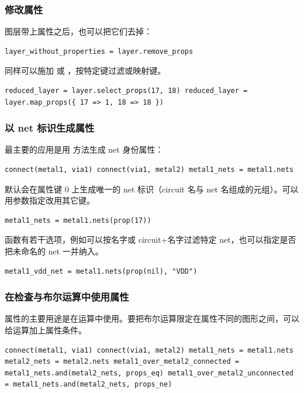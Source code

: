 \subsubsection{修改属性}

图层带上属性之后，也可以把它们去掉：

\begin{lstlisting}
layer_without_properties = layer.remove_props
\end{lstlisting}

同样可以施加  或 ，按特定键过滤或映射键。

\begin{lstlisting}
reduced_layer = layer.select_props(17, 18) reduced_layer = layer.map_props({ 17 => 1, 18 => 18 })
\end{lstlisting}

\subsubsection{以 net 标识生成属性}

最主要的应用是用  方法生成 net 身份属性：

\begin{lstlisting}
connect(metal1, via1) connect(via1, metal2) metal1_nets = metal1.nets
\end{lstlisting}

默认会在属性键 0 上生成唯一的 net 标识（circuit 名与 net 名组成的元组）。可以用参数指定改用其它键。

\begin{lstlisting}
metal1_nets = metal1.nets(prop(17))
\end{lstlisting}

 函数有若干选项，例如可以按名字或 circuit+名字过滤特定 net，也可以指定是否把未命名的 net 一并纳入。

\begin{lstlisting}
metal1_vdd_net = metal1.nets(prop(nil), "VDD")
\end{lstlisting}

\subsubsection{在检查与布尔运算中使用属性}

属性的主要用途是在运算中使用。要把布尔运算限定在属性不同的图形之间，可以给运算加上属性条件。

\begin{lstlisting}
connect(metal1, via1) connect(via1, metal2) metal1_nets = metal1.nets metal2_nets = metal2.nets metal1_over_metal2_connected = metal1_nets.and(metal2_nets, props_eq) metal1_over_metal2_unconnected = metal1_nets.and(metal2_nets, props_ne)
\end{lstlisting}

